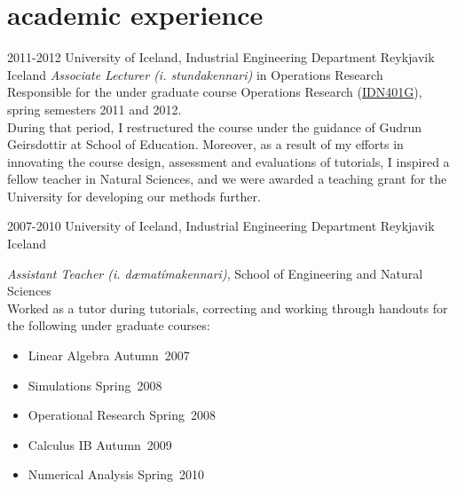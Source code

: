 \documentclass[]{cv} %
\begin{document}
\section{academic experience}
\begin{entrylist}
\entry
{2011-2012}
{University of Iceland, Industrial Engineering Department}
{Reykjavik Iceland}
{\emph{Associate Lecturer (i. stundakennari)} in Operations Research \\
Responsible for the under graduate course Operations Research (\href{https://ugla.hi.is/kennsluskra/index.php?sid=&tab=nam&chapter=namskeid&id=08213020110}{IDN401G}), spring semesters 2011 and 2012. \\
During that period, I restructured the course under the guidance of Gudrun Geirsdottir at School of Education. Moreover, as a result of my efforts in innovating the course design, assessment and evaluations of tutorials, I inspired a fellow teacher in Natural Sciences, and we were awarded a teaching grant for the University for developing our methods further.
}
\end{entrylist}
\begin{entrylist}
\entry
{2007-2010}
{University of Iceland, Industrial Engineering Department}
{Reykjavik Iceland}
{\emph{Assistant Teacher (i. dæmatímakennari)}, School of Engineering and Natural Sciences \\
Worked as a tutor during tutorials, correcting and working through handouts for the following under graduate courses: 
\begin{itemize}
		\item Linear Algebra 		\hfill Autumn~2007
		\item Simulations			\hfill Spring~2008
		\item Operational Research 	\hfill Spring~2008
		\item Calculus IB			\hfill Autumn~2009
		\item Numerical Analysis 	\hfill Spring~2010
\end{itemize}	
}
\end{entrylist}   
\end{document}
